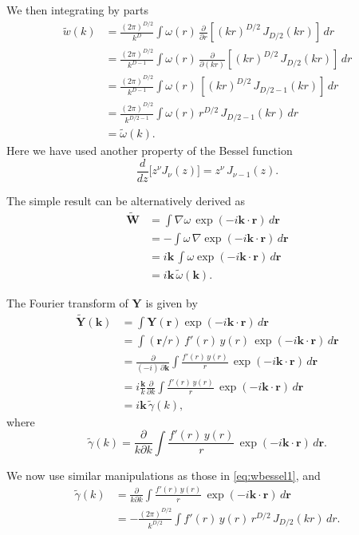 \documentclass[preprint]{revtex4-1}
\numberwithin{equation}{subsection}
\numberwithin{table}{section}
\newcommand{\vct}[1]{\mathbf{#1}}
\providecommand{\vr}{} %
\renewcommand{\vr}{\vct{r}}
\newcommand{\vk}{\vct{k}}
\begin{document}
We then integrating by parts
\begin{align*}
\tilde{w}(k)
&=
\frac{(2\pi)^{D/2}}{k^D}
\int
\omega(r) \,
\frac{\partial }{\partial r}
\left[
  (kr)^{D/2}
  \, J_{D/2}(kr)
\right]
\, dr
\\
&=
\frac{(2\pi)^{D/2}}{k^{D-1}}
\int
\omega(r) \,
\frac{\partial }{\partial (kr)}
\left[
  (kr)^{D/2}
  \, J_{D/2}(kr)
\right]
\, dr
\\
&=
\frac{(2\pi)^{D/2}}{k^{D-1}}
\int
\omega(r) \,
\left[
  (kr)^{D/2}
  \, J_{D/2-1}(kr)
\right]
\, dr
\\
&=
\frac{(2\pi)^{D/2}}{k^{D/2-1}}
\int
\omega(r) \,
  r^{D/2}
  \, J_{D/2-1}(kr)
\, dr
\\
&=\tilde\omega(k).
\end{align*}
Here we have used another property of the Bessel function
\[
  \frac{d}{dz} \Big[ z^\nu J_\nu(z) \Big]
=
  z^\nu \, J_{\nu - 1}(z).
\]

The simple result can be alternatively derived as
\begin{align*}
  \tilde{\vct{W}}
&=
\int \nabla \omega \, \exp(-i\vk \cdot \vr) \, d\vr
\\
&=
-\int \omega \, \nabla \exp(-i\vk \cdot \vr) \, d\vr
\\
&=
i \vk \, \int \omega \exp(-i\vk \cdot \vr) \, d\vr
\\
&=
i \vk \, \tilde{\omega}(\vk).
\end{align*}


The Fourier transform of $\vct{Y}$ is given by
\begin{align*}
  \tilde{\vct{Y}}(\vk)
&=
\int \vct{Y}(\vr) \exp(-i\vk\cdot\vr) \, d\vr
\\
&=
\int (\vr/r) \, f'(r) \, y(r) \, \exp(-i\vk\cdot\vr) \, d\vr
\\
&=
\frac{\partial}{(-i) \, \partial \vk}
\int \frac{f'(r) \, y(r)}{r} \, \exp(-i\vk\cdot\vr) \, d\vr
\\
&=
i \frac{\vk}{k} \frac{\partial}{\partial k}
\int \frac{f'(r) \, y(r)}{r} \, \exp(-i\vk\cdot\vr) \, d\vr
\\
&=
i \vk \, \tilde{\gamma}(k),
\end{align*}
%
where
\[
\tilde{\gamma}(k)
=
\frac{\partial}{k\partial k}
\int \frac{f'(r) \, y(r)}{r} \, \exp(-i\vk\cdot\vr) \, d\vr.
\]

We now use similar manipulations as
those in \eqref{eq:wbessel1}, and
\begin{align*}
\tilde{\gamma}(k)
&=
\frac{\partial}{k\partial k}
\int \frac{f'(r) \, y(r)}{r} \, \exp(-i\vk\cdot\vr) \, d\vr
\\
&=-\frac{(2\pi)^{D/2}}{k^{D/2}}
\int f'(r) \, y(r) \, r^{D/2} \, J_{D/2}(kr) \, dr.
\end{align*}
\end{document}
